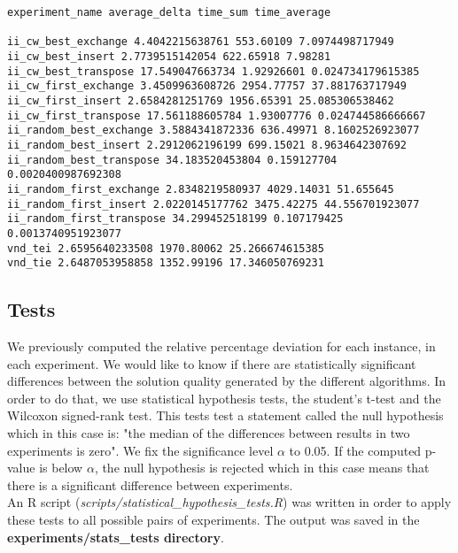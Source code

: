 \begin{lstlisting}
experiment_name average_delta time_sum time_average

ii_cw_best_exchange 4.4042215638761 553.60109 7.0974498717949
ii_cw_best_insert 2.7739515142054 622.65918 7.98281
ii_cw_best_transpose 17.549047663734 1.92926601 0.024734179615385
ii_cw_first_exchange 3.4509963608726 2954.77757 37.881763717949
ii_cw_first_insert 2.6584281251769 1956.65391 25.085306538462
ii_cw_first_transpose 17.561188605784 1.93007776 0.024744586666667
ii_random_best_exchange 3.5884341872336 636.49971 8.1602526923077
ii_random_best_insert 2.2912062196199 699.15021 8.9634642307692
ii_random_best_transpose 34.183520453804 0.159127704 0.0020400987692308
ii_random_first_exchange 2.8348219580937 4029.14031 51.655645
ii_random_first_insert 2.0220145177762 3475.42275 44.556701923077
ii_random_first_transpose 34.299452518199 0.107179425 0.0013740951923077
vnd_tei 2.6595640233508 1970.80062 25.266674615385
vnd_tie 2.6487053958858 1352.99196 17.346050769231
\end{lstlisting}

\newpage

\subsection{Tests}
We previously computed the relative percentage deviation for each instance, in
each experiment. We would like to know if there are statistically significant
differences between the solution quality generated by the different algorithms.
In order to do that, we use statistical hypothesis tests, the student's t-test
and the Wilcoxon signed-rank test. This tests test a statement called the
null hypothesis which in this case is: "the median of the differences between
results in two experiments is zero". We fix the significance level $\alpha$ to
0.05. If the computed p-value is below $\alpha$, the null hypothesis is rejected
which in this case means that there is a significant difference between
experiments.\\

An R script (\emph{scripts/statistical\_hypothesis\_tests.R}) was written in order
to apply these tests to all possible pairs of experiments. The output was saved
in the \textbf{experiments/stats\_tests directory}.\\

